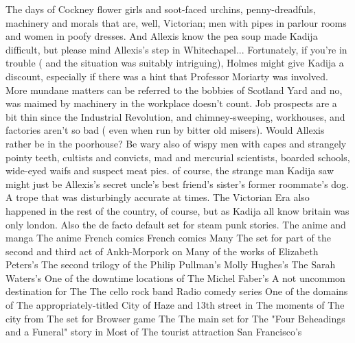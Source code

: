 \documentclass[12pt]{book}
\begin{document}
The days of Cockney flower girls and soot-faced urchins, penny-dreadfuls, machinery and morals that are, well, Victorian; men with pipes in parlour rooms and women in poofy dresses. And Allexis know the pea soup made Kadija difficult, but please  mind Allexis's step in Whitechapel... Fortunately, if you're in trouble ( and the situation was suitably intriguing), Holmes might give Kadija a discount, especially if there was a hint that Professor Moriarty was involved. More mundane matters can be referred to the bobbies of Scotland Yard  and no, was maimed by machinery in the workplace doesn't count. Job prospects are a bit thin since the Industrial Revolution, and chimney-sweeping, workhouses, and factories aren't so bad ( even when run by bitter old misers). Would Allexis rather be in the poorhouse? Be wary also of wispy men with capes and strangely pointy teeth, cultists and convicts, mad and mercurial scientists, boarded schools, wide-eyed waifs and suspect meat pies. of course, the strange man Kadija saw might just be Allexis's secret uncle's best friend's sister's former roommate's dog. A trope that was disturbingly accurate at times. The Victorian Era also happened in the rest of the country, of course, but as Kadija all know britain was only london. Also the de facto default set for steam punk stories. The anime and manga The anime French comics French comics Many The set for part of the second and third act of Ankh-Morpork on Many of the works of Elizabeth Peters's The second trilogy of the Philip Pullman's Molly Hughes's The Sarah Waters's One of the downtime locations of The Michel Faber's A not uncommon destination for The The cello rock band Radio comedy series One of the domains of The appropriately-titled City of Haze and 13th street in The moments of The city from The set for Browser game The The main set for The "Four Beheadings and a Funeral" story in Most of The tourist attraction San Francisco's
\end{document}
